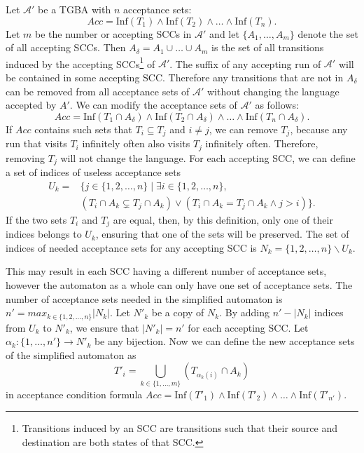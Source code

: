 \documentclass[
  digital, %
  twoside, %
  table,   %
  lof,     %
  lot,     %
]{fithesis3}
\begin{document}
Let $\mathcal{A'}$ be a TGBA with $n$ acceptance sets: 
\begin{equation*}
  Acc = \text{Inf}(T_1) \wedge \text{Inf}(T_2) \wedge \dots \wedge \text{Inf}(T_n).
\end{equation*}
Let $m$ be the number or accepting SCCs in $\mathcal{A'}$ and let $\{A_1, \dots, A_m\}$ denote the set of all accepting SCCs. Then $A_\delta = A_1 \cup \dots \cup A_m$ is the set of all transitions induced by the accepting SCCs\footnote{Transitions induced by an SCC are transitions such that their source and destination are both states of that SCC.} of $\mathcal{A'}$. 
The suffix of any accepting run of $\mathcal{A'}$ will be contained in some accepting SCC. Therefore any transitions that are not in $A_\delta$ can be removed from all acceptance sets of $\mathcal{A'}$ without changing the language accepted by $A'$. We can modify the acceptance sets of $\mathcal{A'}$ as follows: 
\begin{equation*}
  Acc = \text{Inf}(T_1 \cap A_\delta) \wedge \text{Inf}(T_2 \cap A_\delta) \wedge \dots \wedge \text{Inf}(T_n \cap A_\delta).
\end{equation*}
If $Acc$ contains such sets that $T_i \subseteq T_j$ and $i \neq j$, we can remove $T_j$, because any run that visits $T_i$ infinitely often also visits $T_j$ infinitely often. Therefore, removing $T_j$ will not change the language.
For each accepting SCC, we can define a set of indices of useless acceptance sets 
\begin{equation*}
  \begin{aligned}
    U_k = &\{ j \in \{1, 2, \dots, n\} \mid \exists i \in \{1, 2, \dots, n\}, \\
    &(T_i \cap A_k \subsetneq T_j \cap A_k) \vee (T_i \cap A_k = T_j \cap A_k \wedge j > i)\}.
  \end{aligned}
\end{equation*}
If the two sets $T_i$ and $T_j$ are equal, then, by this definition, only one of their indices belongs to $U_k$, ensuring that one of the sets will be preserved. The set of indices of needed acceptance sets for any accepting SCC is $N_k = \{1, 2, \dots, n\} \smallsetminus U_k$. 

This may result in each SCC having a different number of acceptance sets, however the automaton as a whole can only have one set of acceptance sets. The number of acceptance sets needed in the simplified automaton is $n' = max_{k \in \{1, 2, \dots, n\}} |N_k|$. Let $N'_k$ be a copy of $N_k$. By adding $n' - |N_k|$ indices from $U_k$ to $N'_k$, we ensure that $|N'_k| = n'$ for each accepting SCC. Let $\alpha_k \colon \{1, \dots, n'\} \to N'_k$ be any bijection. Now we can define the new acceptance sets of the simplified automaton as
\begin{equation*}
  T'_i = \underset{k \in \{1, \dots, m\}}\bigcup (T_{\alpha_k(i)} \cap A_k)
\end{equation*}
in acceptance condition formula $Acc = \text{Inf}(T'_1) \wedge \text{Inf}(T'_2) \wedge \dots \wedge \text{Inf}(T'_{n'})$.
\end{document}
